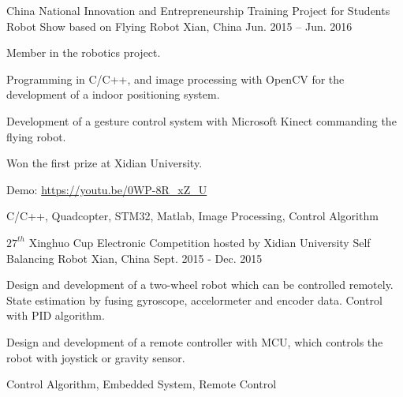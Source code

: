 \begin{cventries}
  \cventry
    {China National Innovation and Entrepreneurship Training Project for Students} 
    {Robot Show based on Flying Robot}
    {Xian, China} %
    {Jun. 2015 – Jun. 2016} %
    {
      \begin{cvitems} %
        \item {Member in the robotics project.}
        \item {Programming in C/C++, and image processing with OpenCV for the development of a indoor positioning system.}
        \item {Development of a gesture control system with Microsoft Kinect commanding the flying robot.}
        \item {Won the first prize at Xidian University.}
        \item {Demo: \url{https://youtu.be/0WP-8R_xZ_U}}
      \end{cvitems}
    }
	{C/C++,  Quadcopter, STM32, Matlab, Image Processing, Control Algorithm }	

  \cventry
    {$27^{th}$ Xinghuo Cup Electronic Competition hosted by Xidian University} %
    {Self Balancing Robot} %
    {Xian, China} %
    {Sept. 2015 - Dec. 2015} %
    {
      \begin{cvitems} %
        \item {Design and development of a two-wheel robot which can be controlled remotely. State estimation by fusing gyroscope, accelormeter and encoder data. Control with PID algorithm.}
       \item {Design and development of a remote controller with MCU, which controls the robot with joystick or gravity sensor.}
      \end{cvitems}
    }{Control Algorithm,  Embedded System, Remote Control}

\end{cventries}

